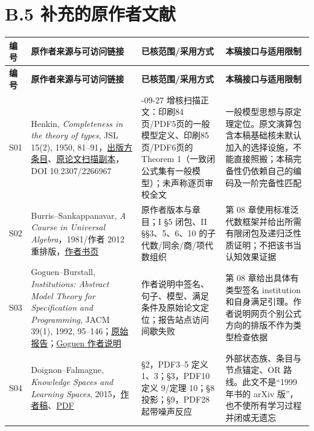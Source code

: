 \documentclass[UTF8,a4paper,zihao=-4,fontset=windows,openany]{ctexbook}
\begin{document}
\section{B.5 补充的原作者文献}
\begingroup\small\setlength{\tabcolsep}{4pt}
\begin{longtable}{l>{\raggedright\arraybackslash}p{}>{\raggedright\arraybackslash}p{}>{\raggedright\arraybackslash}p{}}
\toprule
\textbf{编号} & \textbf{原作者来源与可访问链接} & \textbf{已核范围/采用方式} & \textbf{本稿接口与适用限制} \\
\midrule
\endfirsthead
\toprule
\textbf{编号} & \textbf{原作者来源与可访问链接} & \textbf{已核范围/采用方式} & \textbf{本稿接口与适用限制} \\
\midrule
\endhead
\bottomrule
\endfoot
\bottomrule
\endlastfoot
S01 & Henkin, \emph{Completeness in the theory of types}, JSL 15(2), 1950, 81–91，\href{https://www.cambridge.org/core/journals/journal-of-symbolic-logic/article/abs/completeness-in-the-theory-of-types1/551D2896D3C6F197030D3D8EEA911F1E}{出版方条目}、\href{https://aaronxyliu.github.io/download/PL/Henkin.pdf}{原论文扫描副本}，DOI 10.2307/2266967 & 2026-09-27 增核扫描正文：印刷84页/PDF5页的一般模型定义、印刷85页/PDF6页的 Theorem 1（一致闭公式集有一般模型）；未声称逐页审校全文 & 一般模型思想与原定理定位。原文演算包含本稿基础核未默认加入的选择设施，不能直接照搬；本稿完备性仍依赖自己的编码及一阶完备性匹配 \\
S02 & Burris–Sankappanavar, \emph{A Course in Universal Algebra}，1981/作者 2012 重排版，\href{https://www.math.uwaterloo.ca/\textasciitilde{}snburris/htdocs/ualg.html}{作者书页} & 原作者版本与章目；I §5 闭包、II §§3、5、6、10 的子代数/同余/商/项代数组织 & 第 08 章使用标准泛代数框架并给出所需有限闭包及递归泛性质证明；不把该书当认知效果证据 \\
S03 & Goguen–Burstall, \emph{Institutions: Abstract Model Theory for Specification and Programming}, JACM 39(1), 1992, 95–146；\href{https://publish.lfcs.inf.ed.ac.uk/reports/90/ECS-LFCS-90-106/}{原始报告}；\href{https://cseweb.ucsd.edu/\textasciitilde{}goguen/projs/inst.html}{Goguen 作者说明} & 作者说明中签名、句子、模型、满足条件及原始论文定位；报告站点访问间歇失败 & 第 08 章给出具体有类型签名 institution 和自身满足引理。作者说明网页个别公式方向的排版不作为类型检查依据 \\
S04 & Doignon–Falmagne, \emph{Knowledge Spaces and Learning Spaces}, 2015，\href{https://arxiv.org/abs/1511.06757}{作者稿}、\href{https://arxiv.org/pdf/1511.06757}{PDF} & §2，PDF3–5 定义 1、3；§3，PDF10 定义 9/定理 10；§8 投影；§9，PDF28 起带噪声反应 & 外部状态族、条目与节点锚定、OR 路线。此文不是“1999 年书的 arXiv 版”，也不使所有学习过程并闭或无遗忘 \\

\end{longtable}
\end{document}
